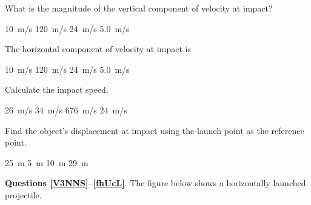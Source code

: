 \documentclass[../main-physics-problems.tex]{subfiles}
\begin{document}
\begin{questions}
\question 
What is the magnitude of the vertical component of velocity at impact?

\begin{randomizechoices}
    \correctchoice \SI{10}{m/s}
    \choice \SI{120}{m/s}
    \choice \SI{24}{m/s}
    \choice \SI{5.0}{m/s}
\end{randomizechoices}

\question 
The horizontal component of velocity at impact is

\begin{randomizechoices}
    \choice \SI{10}{m/s}
    \choice \SI{120}{m/s}
    \correctchoice \SI{24}{m/s}
    \choice \SI{5.0}{m/s}
\end{randomizechoices}

\question
Calculate the impact speed.

\begin{randomizechoices}
    \correctchoice \SI{26}{m/s}
    \choice \SI{34}{m/s}
    \choice \SI{676}{m/s}
    \choice \SI{24}{m/s}
\end{randomizechoices}

\question \label{Gw5bh}
Find the object's displacement at impact using the launch point as the reference point.

\begin{randomizechoices}
    \correctchoice \SI{25}{m}
    \choice \SI{5}{m}
    \choice \SI{10}{m}
    \choice \SI{29}{m}
\end{randomizechoices}

\clearpage

\begin{EnvUplevel}
    \textbf{Questions \ref{V3NNS}--\ref{fhUcL}}. The figure below shows a horizontally launched projectile.

\begin{center}
\end{center}
\end{EnvUplevel}


\end{questions}
\end{document}
